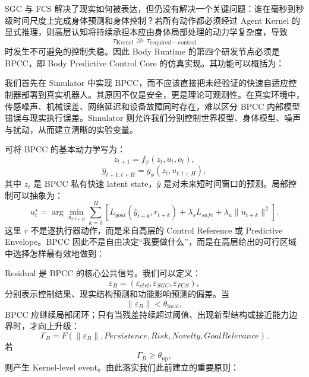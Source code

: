 SGC 与 FCS 解决了现实如何被表达，但仍没有解决一个关键问题：谁在毫秒到秒级时间尺度上完成身体预测和身体控制？若所有动作都必须经过 Agent Kernel 的显式推理，则高层认知将持续承担本应由身体局部处理的动力学复杂度，导致
\[
\tau_{\mathrm{Kernel}}
\gg
\tau_{\mathrm{required-control}}
\]
时发生不可避免的控制失稳。因此 Body Runtime 的第四个研发节点必须是 BPCC，即 Body Predictive Control Core 的仿真实现。其功能可以概括为：
\begin{statementbox}
\centering
{}
\end{statementbox}

我们首先在 Simulator 中实现 BPCC，而不应该直接把未经验证的快速自适应控制器部署到真实机器人。其原因不仅是安全，更是理论可观测性。在真实环境中，传感噪声、机械误差、网络延迟和设备故障同时存在，难以区分 BPCC 内部模型错误与现实执行误差。Simulator 则允许我们分别控制世界模型、身体模型、噪声与扰动，从而建立清晰的实验变量。

可将 BPCC 的基本动力学写为：
\[
z_{t+1}
=
f_\phi(z_t,u_t,o_t),
\]
\[
\hat y_{t+1:t+H}
=
g_\phi(z_t,u_{t:t+H}),
\]
其中 $z_t$ 是 BPCC 私有快速 latent state，$\hat y$ 是对未来短时间窗口的预测。局部控制可以抽象为：
\[
u_t^\star
=
\arg\min_{u_{t:t+H}}
\sum_{k=0}^{H}
\left[
L_{goal}(\hat y_{t+k},r_{t+k})
+
\lambda_sL_{safe}
+
\lambda_u\|u_{t+k}\|^2
\right].
\]
这里 $r$ 不是逐执行器动作，而是来自高层的 Control Reference 或 Predictive Envelope。BPCC 因此不是自由决定“我要做什么”，而是在高层给出的可行区域中选择怎样最有效地做到：
\begin{statementbox}
\centering
{}
\end{statementbox}

Residual 是 BPCC 的核心公共信号。我们可以定义：
\[
\varepsilon_B
=
\left(
\varepsilon_{ctrl},
\varepsilon_{SGC},
\varepsilon_{FCS}
\right),
\]
分别表示控制结果、现实结构预测和功能影响预测的偏差。当
\[
\|\varepsilon_B\|
<
\theta_{\mathrm{local}},
\]
BPCC 应继续局部闭环；只有当残差持续超过阈值、出现新型结构或接近能力边界时，才向上升级：
\[
\Gamma_B
=
F(
\|\varepsilon_B\|,
Persistence,
Risk,
Novelty,
GoalRelevance
).
\]
若
\[
\Gamma_B\geq\theta_{\mathrm{up}},
\]
则产生 Kernel-level event。由此落实我们此前建立的重要原则：
\begin{statementbox}
\centering
{}
\end{statementbox}

